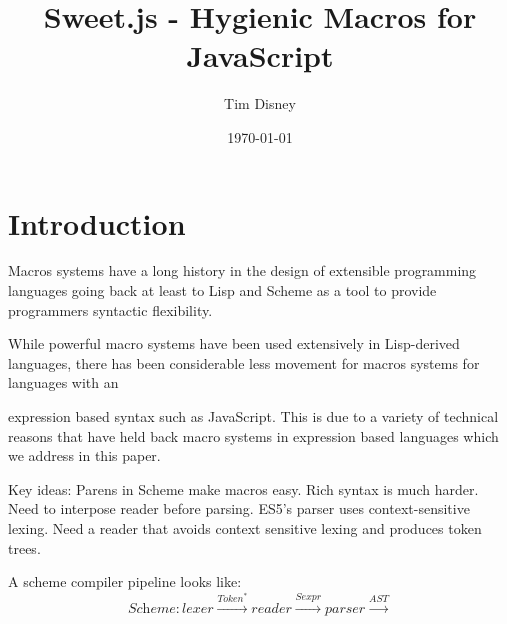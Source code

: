 \documentclass[preprint,10pt]{sigplanconf}
\author{Tim Disney}
\date{\today}
\title{Sweet.js - Hygienic Macros for JavaScript}
\begin{document}

\lstset{
   language=JavaScript,
   extendedchars=true,
   basicstyle=\footnotesize\ttfamily,
   showstringspaces=false,
   showspaces=false,
   numberstyle=\footnotesize,
   numbersep=9pt,
   tabsize=2,
   breaklines=true,
   showtabs=false,
   captionpos=b
}


\maketitle


\section{Introduction}
\label{sec-1}

Macros systems have a long history in the design of extensible
programming languages going back at least to Lisp and Scheme
\cite{Kohlbecker1987,Foderaro1983} as a tool to provide
programmers syntactic flexibility.

While powerful macro systems have been used extensively in 
Lisp-derived languages, there has been considerable less movement for macros
systems for languages with an 

expression based syntax such as
JavaScript. This is due to a variety of technical reasons that have
held back macro systems in expression based languages which we address
in this paper.

Key ideas: Parens in Scheme make macros easy. Rich syntax is much
harder. Need to interpose reader before parsing. ES5's parser uses
context-sensitive lexing. Need a reader that avoids context sensitive
lexing and produces token trees.

A scheme compiler pipeline looks like:
\[
\textit{Scheme} : 
\textit{lexer} \xrightarrow{\textit{Token}^{*}}
\textit{reader} \xrightarrow{\textit{Sexpr}}
\textit{parser} \xrightarrow{\textit{AST}}
\]
\end{document}
